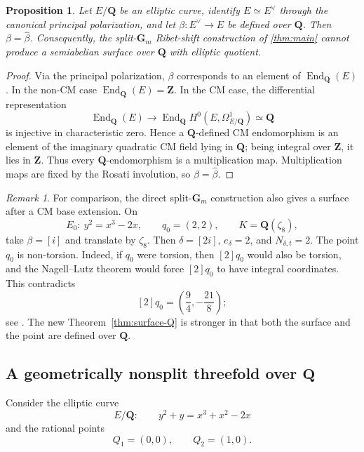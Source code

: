 \documentclass[11pt,letterpaper,reqno]{amsart}
\newtheorem{proposition}[theorem]{Proposition}
\theoremstyle{definition}
\theoremstyle{remark}
\newtheorem{remark}[theorem]{Remark}
\newcommand{\Gm}{\mathbf G_m}
\newcommand{\Q}{\mathbf Q}
\newcommand{\Z}{\mathbf Z}
\newcommand{\End}{\operatorname{End}}
\begin{document}
\begin{proposition}
\label{prop:no-surface-Q-method}
Let $E/\Q$ be an elliptic curve, identify $E\simeq E^\vee$ through the
canonical principal polarization, and let $\beta:E^\vee\to E$ be defined over
$\Q$.  Then $\beta=\widehat\beta$.  Consequently, the split-$\Gm$
Ribet-shift construction of \cref{thm:main} cannot produce a semiabelian
surface over $\Q$ with elliptic quotient.
\end{proposition}

\begin{proof}
Via the principal polarization, $\beta$ corresponds to an element of
$\End_\Q(E)$.  In the non-CM case $\End_\Q(E)=\Z$.  In the CM case, the
differential representation
\[
 \End_\Q(E)\longrightarrow
 \End_\Q H^0(E,\Omega^1_{E/\Q})\simeq\Q
\]
is injective in characteristic zero.  Hence a $\Q$-defined CM endomorphism is
an element of the imaginary quadratic CM field lying in $\Q$; being integral
over $\Z$, it lies in $\Z$.  Thus every $\Q$-endomorphism is a multiplication
map.  Multiplication maps are fixed by the Rosati involution, so
$\beta=\widehat\beta$.
\end{proof}

\begin{remark}
For comparison, the direct split-$\Gm$ construction also gives a surface after
a CM base extension.  On
\[
 E_0:\ y^2=x^3-2x,
 \qquad q_0=(2,2),
 \qquad K=\Q(\zeta_8),
\]
take $\beta=[i]$ and translate by $\zeta_8$.  Then
$\delta=[2i]$, $e_\delta=2$, and $N_{\delta,t}=2$.  The point $q_0$ is
non-torsion.  Indeed, if $q_0$ were torsion, then
$[2]q_0$ would also be torsion, and the Nagell--Lutz theorem would force
$[2]q_0$ to have integral coordinates.  This contradicts
\[
 [2]q_0=\left(\frac94,-\frac{21}{8}\right);
\]
see \cite[Chapter~VIII, Corollary~7.2]{SilvermanAEC}.  The new
Theorem~\ref{thm:surface-Q} is stronger in that both the surface and the point are
defined over $\Q$.
\end{remark}


\subsection{A geometrically nonsplit threefold over
\texorpdfstring{$\Q$}{Q}}

Consider the elliptic curve
\begin{equation}\label{eq:E389}
 E/\Q:\qquad y^2+y=x^3+x^2-2x
\end{equation}
and the rational points
\[
 Q_1=(0,0),\qquad Q_2=(1,0).
\]
\end{document}
